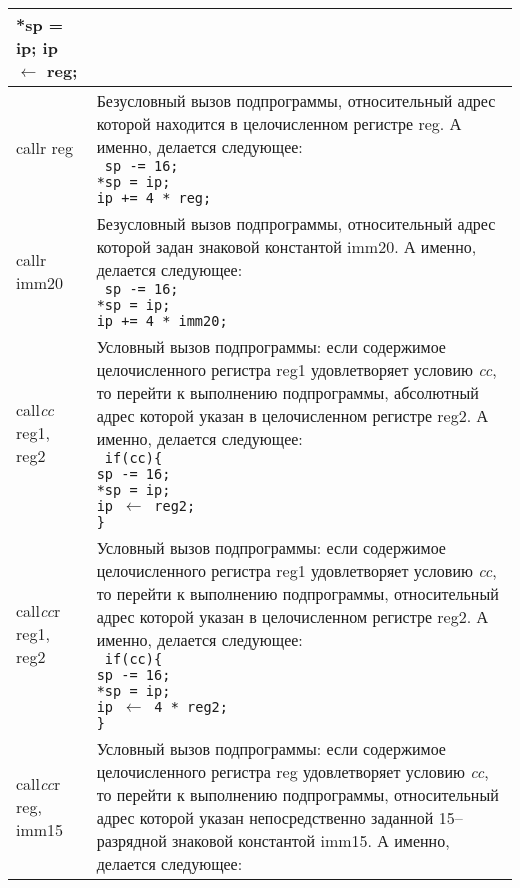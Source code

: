 \documentclass[10pt]{report}
\begin{document}
\begin{longtable}[c]{|l|p{12.5cm}|}
{{{\phantom{aaaa}*sp = ip;\\
\phantom{aaaa}ip $\leftarrow$ reg;
}
}} \\ \hline
callr reg                     & {\parbox{12.4cm}{Безусловный вызов подпрограммы, относительный адрес которой находится в целочисленном регистре reg. А именно, делается следующее:\\ %
\texttt{%
\phantom{aaaa}sp -= 16;\\
\phantom{aaaa}*sp = ip;\\
\phantom{aaaa}ip += 4 * reg;
}
}} \\ \hline
callr imm20                   & {\parbox{12.4cm}{Безусловный вызов подпрограммы, относительный адрес которой задан знаковой константой imm20. А именно, делается следующее:\\ %
\texttt{%
\phantom{aaaa}sp -= 16;\\
\phantom{aaaa}*sp = ip;\\
\phantom{aaaa}ip += 4 * imm20;
}
}} \\ \hline
call\textit{cc} reg1, reg2    & {\parbox{12.4cm}{Условный вызов подпрограммы: если содержимое целочисленного регистра reg1 удовлетворяет условию \textit{cc}, то перейти к выполнению подпрограммы, абсолютный адрес которой указан в целочисленном регистре reg2. А именно, делается следующее:\\ %
\texttt{%
if(cc)\{\\
\phantom{aaaa}sp -= 16;\\
\phantom{aaaa}*sp = ip;\\
\phantom{aaaa}ip $\leftarrow$ reg2;\\
\}
}
}} \\ \hline
call\textit{cc}r reg1, reg2   & {\parbox{12.4cm}{Условный вызов подпрограммы: если содержимое целочисленного регистра reg1 удовлетворяет условию \textit{cc}, то перейти к выполнению подпрограммы, относительный адрес которой указан в целочисленном регистре reg2. А именно, делается следующее:\\ %
\texttt{%
if(cc)\{\\
\phantom{aaaa}sp -= 16;\\
\phantom{aaaa}*sp = ip;\\
\phantom{aaaa}ip $\leftarrow$ 4 * reg2;\\
\}
}
}} \\ \hline
call\textit{cc}r reg, imm15   & {\parbox{12.4cm}{Условный вызов подпрограммы: если содержимое целочисленного регистра reg удовлетворяет условию \textit{cc}, то перейти к выполнению подпрограммы, относительный адрес которой указан непосредственно заданной 15--разрядной знаковой константой imm15. А именно, делается следующее:\\ %
}}
\end{longtable}
\end{document}
